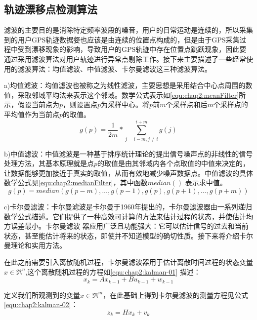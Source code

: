 \subsection{轨迹漂移点检测算法}
\label{sec:section2-1-1}
滤波的主要目的是消除特定频率波段的噪音，用户的日常运动是连续的，所以采集到的用户GPS轨迹数据㛑也应该是由连续的位置点构成的，但是由于GPS采集过程中受到漂移现象的影响，导致用户的GPS轨迹中存在位置点跳跃现象，因此要通过采用滤波算法对用户轨迹进行异常点剔除工作。接下来主要描述了一些经常使用的滤波算法：均值滤波、中值滤波、卡尔曼滤波这三种滤波算法。
\par a)均值滤波：均值滤波也被称之为线性滤波，主要思想是采用结合中心点周围的数值，采取邻域平均法来表示这个邻域。数学公式表示如\ref{equ:chap2:meanFilter}所示，假设当前点为$p$，则设置点$p$为采样中心。将$p$前$m$个采样点和后$m$个采样点的平均值作为当前点$p$的取值。
\begin{equation}
\label{equ:chap2:meanFilter}
g(p)=\frac{1}{2m} \ast \sum_{j=i-m,j\neq i}^{i+m}g(j)
\end{equation}
\par b)中值滤波：中值滤波是一种基于排序统计理论的提出信号噪声点的非线性的信号处理方法，其基本原理就是点$p$的取值是由其邻域内各个点取值的中值来决定的，让数据能够更加接近于真实的取值，从而有效地减少噪声数据点。中值滤波的具体数学公式见\ref{equ:chap2:medianFilter}，其中函数$median()$ 表示求中值。
\begin{equation}
\label{equ:chap2:medianFilter}
g(p)=median({g(p-m),...,g(p-1),g(p),g(p+1),...,g(p+m)})
\end{equation}
\par c)卡尔曼滤波：卡尔曼滤波是卡尔曼于1960年提出的，卡尔曼滤波器由一系列递归数学公式描述。它们提供了一种高效可计算的方法来估计过程的状态，并使估计均方误差最小。卡尔曼滤波
器应用广泛且功能强大：它可以估计信号的过去和当前状态，甚至能估计将来的状态，即使并不知道模型的确切性质。接下来将介绍卡尔曼理论和实用方法。
\par 在此之前需要引入离散随机过程，卡尔曼滤波器用于估计离散时间过程的状态变量$x\in \Re^{n}$,这个离散随机过程的方程如\ref{equ:chap2:kalman-01} 描述：
\begin{equation}
\label{equ:chap2:kalman-01}
x_{k}=Ax_{k-1}+Bu_{k-1}+w_{k-1}
\end{equation}
\par 定义我们所观测到的变量$x\in \Re^{m}$，在此基础上得到卡尔曼滤波的测量方程见公式\ref{equ:chap2:kalman-02}：
\begin{equation}
\label{equ:chap2:kalman-02}
z_{k}=Hx_{k}+v_{k}
\end{equation}

